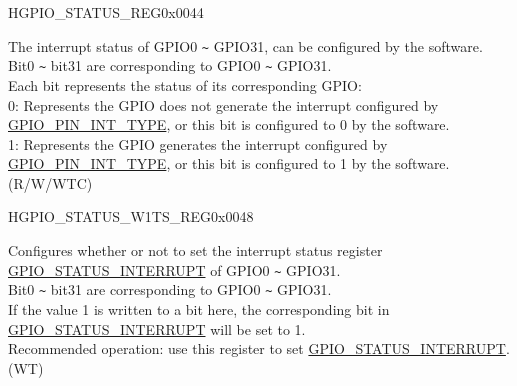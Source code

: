 \begin{register}{H}{GPIO\_STATUS\_REG}{0x0044}\label{regdesc:GPIOSTATUSREG}
%
\regnewline%
\begin{regdesc}\begin{reglist}
\label{fielddesc:GPIOSTATUSINTERRUPT}\item [GPIO\_STATUS\_INTERRUPT] The interrupt status of GPIO0 \verb+~+ GPIO31, can be configured by the software. \\
Bit0 \verb+~+ bit31 are corresponding to GPIO0 \verb+~+ GPIO31.\\
Each bit represents the status of its corresponding GPIO:\\
0: Represents the GPIO does not generate the interrupt configured by \hyperref[fielddesc:GPIOPINNINTTYPE]{GPIO\_PIN\_INT\_TYPE}, or this bit is configured to 0 by the software.\\
1: Represents the GPIO generates the interrupt configured by \hyperref[fielddesc:GPIOPINNINTTYPE]{GPIO\_PIN\_INT\_TYPE}, or this bit is configured to 1 by the software.\\
(R/W/WTC)
\end{reglist}\end{regdesc}
\end{register}


\begin{register}{H}{GPIO\_STATUS\_W1TS\_REG}{0x0048}\label{regdesc:GPIOSTATUSW1TSREG}
%
\regnewline%
\begin{regdesc}\begin{reglist}
\label{fielddesc:GPIOSTATUSW1TS}\item [GPIO\_STATUS\_W1TS] Configures whether or not to set the interrupt status register \hyperref[fielddesc:GPIOSTATUSINTERRUPT]{GPIO\_STATUS\_INTERRUPT} of GPIO0 \verb+~+ GPIO31. \\
Bit0 \verb+~+ bit31 are corresponding to GPIO0 \verb+~+ GPIO31.\\
If the value 1 is written to a bit here, the corresponding bit in \hyperref[fielddesc:GPIOSTATUSINTERRUPT]{GPIO\_STATUS\_INTERRUPT} will be set to 1. \\
Recommended operation: use this register to set \hyperref[fielddesc:GPIOSTATUSINTERRUPT]{GPIO\_STATUS\_INTERRUPT}. \\
(WT)
\end{reglist}\end{regdesc}
\end{register}


